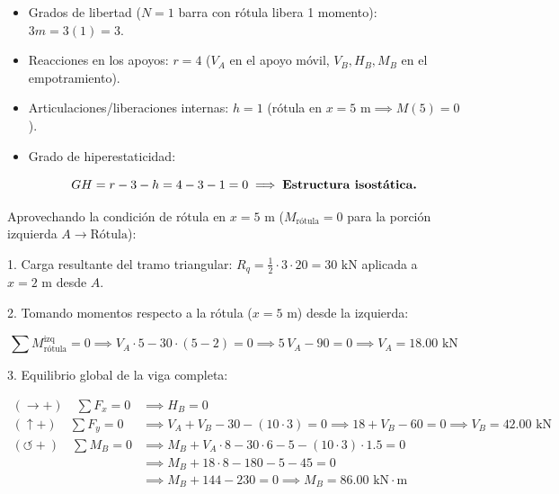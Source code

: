 \begin{itemize}

    \item Grados de libertad ($N=1$ barra con rótula libera 1 momento): $3m = 3(1) = 3$.

    \item Reacciones en los apoyos: $r = 4$ ($V_A$ en el apoyo móvil, $V_B, H_B, M_B$ en el empotramiento).

    \item Articulaciones/liberaciones internas: $h = 1$ (rótula en $x=5\text{ m} \implies M(5) = 0$).

    \item Grado de hiperestaticidad:

          \[

              GH = r - 3 - h = 4 - 3 - 1 = 0 \implies \text{\textbf{Estructura isostática.}}

          \]

\end{itemize}




Aprovechando la condición de rótula en $x = 5\text{ m}$ ($M_{\text{rótula}} = 0$ para la porción izquierda $A \to \text{Rótula}$):

1. Carga resultante del tramo triangular: $R_q = \frac{1}{2} \cdot 3 \cdot 20 = 30\text{ kN}$ aplicada a $x = 2\text{ m}$ desde $A$.

2. Tomando momentos respecto a la rótula ($x=5\text{ m}$) desde la izquierda:

\[

    \sum M_{\text{rótula}}^{\text{izq}} = 0 \implies V_A \cdot 5 - 30 \cdot (5 - 2) = 0 \implies 5\,V_A - 90 = 0 \implies \boxed{V_A = 18.00\text{ kN}}

\]

3. Equilibrio global de la viga completa:

\begin{align}

    (\rightarrow +) \quad \sum F_x = 0      & \implies \boxed{H_B = 0}                                                                                     \\

    (\uparrow +) \quad \sum F_y = 0         & \implies V_A + V_B - 30 - (10 \cdot 3) = 0 \implies 18 + V_B - 60 = 0 \implies \boxed{V_B = 42.00\text{ kN}} \\

    (\circlearrowleft +) \quad \sum M_B = 0 & \implies M_B + V_A \cdot 8 - 30 \cdot 6 - 5 - (10 \cdot 3) \cdot 1.5 = 0                                     \\

                                            & \implies M_B + 18 \cdot 8 - 180 - 5 - 45 = 0                                                                 \\

                                            & \implies M_B + 144 - 230 = 0 \implies \boxed{M_B = 86.00\text{ kN}\cdot\text{m}}

\end{align}



